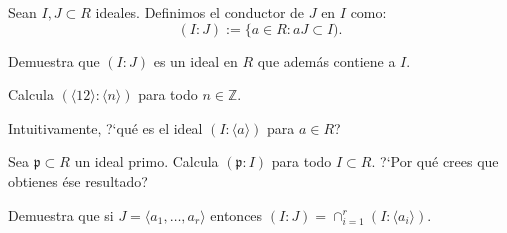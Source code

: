 \begin{problem}
{}
Sean $I, J\subset R$ ideales. Definimos el conductor de $J$ en $I$  como:
$$(I:J):=\{a\in R: aJ\subset I).$$

\ppart Demuestra que $(I:J)$ es un ideal en $R$ que además contiene a $I$.

\ppart Calcula $(\langle 12\rangle : \langle n \rangle)$ para todo  $n\in {\mathbb Z}$.

\ppart Intuitivamente,  ?`qué es el ideal $(I: \langle a\rangle)$ para $a\in R$?

\ppart Sea ${\mathfrak p}\subset R$ un ideal primo. Calcula $({\mathfrak p}: I)$ para todo $I\subset R$.
?`Por qué crees que obtienes ése   resultado?

\ppart Demuestra que si $J=\langle a_1,\ldots, a_r\rangle$ entonces $(I:J)=\cap_{i=1}^r(I: \langle a_i\rangle).$
\solution
\end{problem}
